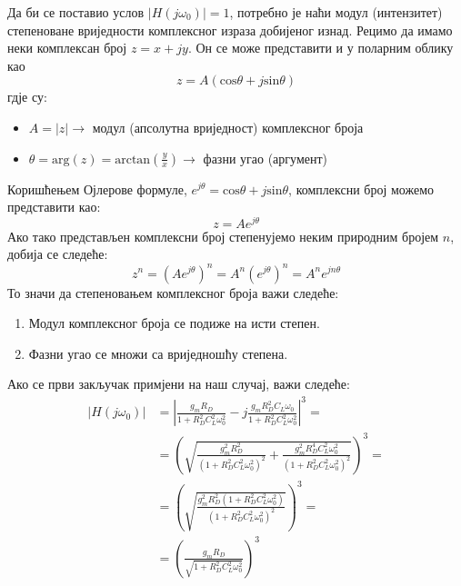 \documentclass[master]{finthesis}
\begin{document}
Да би се поставио услов $|H(j\omega_{0})|=1$, потребно је наћи модул (интензитет) степеноване вриједности комплексног израза добијеног изнад. Рецимо да имамо неки комплексан број $z=x+jy$. Он се може представити и у поларним облику као
\begin{equation}
	\label{compl_1}
	z = A(\text{cos}\theta + j\text{sin}\theta)
\end{equation}
гдје су:
\begin{itemize}
	\item $A = |z| \rightarrow$ модул (апсолутна вриједност) комплексног броја
	\item $\theta = \text{arg}(z) = \displaystyle \text{arctan}\left(\frac{y}{x}\right) \rightarrow$ фазни угао (аргумент)
\end{itemize}
Коришћењем Ојлерове формуле, $e^{j\theta} = \text{cos}\theta + j\text{sin}\theta$, комплексни број можемо представити као:
\begin{equation}
	\label{compl_2}
	z = Ae^{j\theta}
\end{equation}
Ако тако представљен комплексни број степенујемо неким природним бројем $n$, добија се следеће:
\begin{equation}
	\label{compl_3}
	z^{n} = \left(Ae^{j\theta}\right)^{n} = A^{n}\left(e^{j\theta}\right)^{n} = A^{n}e^{jn\theta}
\end{equation}
То значи да степеновањем комплексног броја важи следеће:
\begin{enumerate}
	\item Модул комплексног броја се подиже на исти степен.
	\item Фазни угао се множи са вриједношћу степена.
\end{enumerate}
Ако се први закључак примјени на наш случај, важи следеће:
\begin{equation} 
	\label{osc_feedback_eq_12}
	\displaystyle
	\begin{split}
		|H(j\omega_{0})| &= \left|\frac{g_{m}R_{D}}{1+R_{D}^{2}C_{L}^{2}\omega_{0}^2}-j\frac{g_{m}R_{D}^{2}C_{L}\omega_{0}}{1+R_{D}^{2}C_{L}^{2}\omega_{0}^{2}}\right|^{3} = \\
				 &= \left(\sqrt{\frac{g_{m}^{2}R_{D}^{2}}{(1+R_{D}^{2}C_{L}^{2}\omega_{0}^{2})^{2}}+\frac{g_{m}^{2}R_{D}^{4}C_{L}^{2}\omega_{0}^{2}}{(1+R_{D}^{2}C_{L}^{2}\omega_{0}^{2})^{2}}}\right)^{3} = \\
				 &= \left(\sqrt{\frac{g_{m}^{2}R_{D}^{2}(1+R_{D}^{2}C_{L}^{2}\omega_{0}^{2})}{(1+R_{D}^{2}C_{L}^{2}\omega_{0}^{2})^{2}}}\right)^{3} = \\
				 &= \left(\frac{g_{m}R_{D}}{\sqrt{1+R_{D}^{2}C_{L}^{2}\omega_{0}^{2}}}\right)^{3}
	\end{split}
\end{equation}
\end{document}
